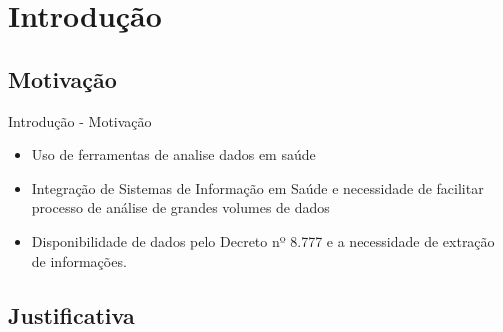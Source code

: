 \documentclass[10pt,brazil]{beamer}
\theoremstyle{definition}
\begin{document}
\section{Introdução}

\subsection{Motivação}

\begin{frame}{Introdução - Motivação}
  \begin{itemize}[]
    \item Uso de ferramentas de analise dados em saúde \cite{galvao_desafios_2019}
    \item Integração de Sistemas de Informação em Saúde e necessidade de facilitar processo de análise de grandes volumes de dados \cite{galvao_desafios_2019,mehta_concurrence_2018}
    \item Disponibilidade de dados pelo Decreto nº 8.777 \cite{brasildisponibilidade2016} e a necessidade de extração de informações.
  \end{itemize}
\end{frame}


\subsection{Justificativa}
\end{document}
